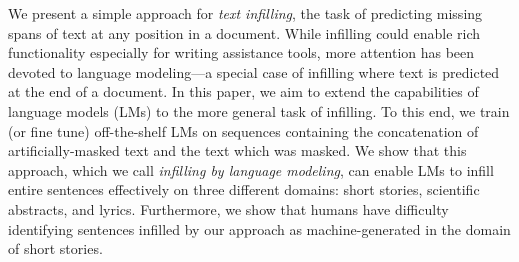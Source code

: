 We present a simple approach for \emph{text infilling}, the task of predicting missing spans of text at any position in a document. While infilling could enable rich functionality especially for writing assistance tools, more attention has been devoted to language modeling---a special case of infilling where text is predicted at the end of a document. In this paper, we aim to extend the capabilities of language models (LMs) to the more general task of infilling. To this end, we train (or fine tune) off-the-shelf LMs on sequences containing the concatenation of artificially-masked text and the text which was masked. We show that this approach, which we call \emph{infilling by language modeling}, can enable LMs to infill entire sentences effectively on three different domains: short stories, scientific abstracts, and lyrics. Furthermore, we show that humans have difficulty identifying sentences infilled by our approach as machine-generated in the domain of short stories.
